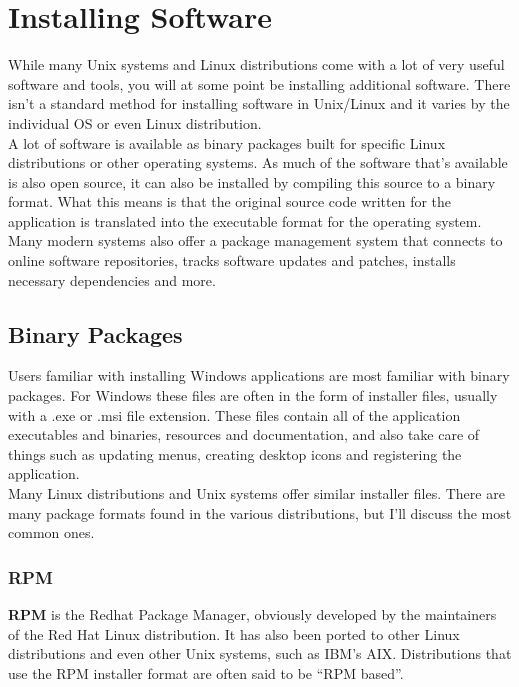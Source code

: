 \chapter{Installing Software}

While many Unix systems and Linux distributions come with a lot of very useful software and tools, you will at some point be installing additional software.  There isn't a standard method for installing software in Unix/Linux and it varies by the individual OS or even Linux distribution.\\

A lot of software is available as binary packages built for specific Linux distributions or other operating systems.  As much of the software that's available is also open source, it can also be installed by compiling this source to a binary format.  What this means is that the original source code written for the application is translated into the executable format for the operating system.\\

Many modern systems also offer a package management system that connects to online software repositories, tracks software updates and patches, installs necessary dependencies and more.

\section{Binary Packages}

Users familiar with installing Windows applications are most familiar with binary packages.  For Windows these files are often in the form of installer files, usually with a .exe or .msi file extension.  These files contain all of the application executables and binaries, resources and documentation, and also take care of things such as updating menus, creating desktop icons and registering the application.\\

Many Linux distributions and Unix systems offer similar installer files.  There are many package formats found in the various distributions, but I'll discuss the most common ones.

\subsection{RPM}

\textbf{RPM} is the Redhat Package Manager, obviously developed by the maintainers of the Red Hat Linux distribution.  It has also been ported to other Linux distributions and even other Unix systems, such as IBM's AIX.  Distributions that use the RPM installer format are often said to be ``RPM based''.\\


